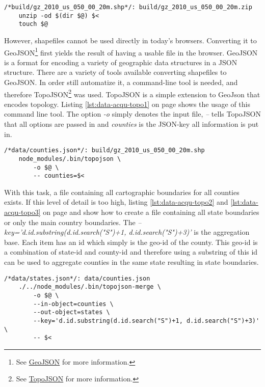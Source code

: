 \begin{lstlisting}[style={makefile}, caption={Make task for unzipping files}, label={lst:data-acqu-unzip}]
/*build/gz_2010_us_050_00_20m.shp*/: build/gz_2010_us_050_00_20m.zip
    unzip -od $(dir $@) $<
    touch $@
\end{lstlisting}

However, shapefiles cannot be used directly in today's browsers. Converting it to GeoJSON\footnote{See \href{http://geojson.org/}{GeoJSON} for more information.} first yields the result of having a usable file in the browser. GeoJSON is a format for encoding a variety of geographic data structures in a JSON structure. There are a variety of tools available converting shapefiles to GeoJSON. In order still automatize it, a command-line tool is needed, and therefore TopoJSON\footnote{See \href{https://github.com/mbostock/topojson}{TopoJSON} for more information.} was used. TopoJSON is a simple extension to GeoJson that encodes topology. Listing \ref{lst:data-acqu-topo1} on page \pageref{lst:data-acqu-topo1} shows the usage of this command line tool. The option \textit{-o} simply denotes the input file, \textit{--} tells TopoJSON that all options are passed in and \textit{counties} is the JSON-key all information is put in.

\begin{lstlisting}[style={makefile}, caption={Make task for converting shapefiles to geojson}, label={lst:data-acqu-topo1}]
/*data/counties.json*/: build/gz_2010_us_050_00_20m.shp
    node_modules/.bin/topojson \
        -o $@ \
        -- counties=$<
\end{lstlisting}

With this task, a file containing all cartographic boundaries for all counties exists. If this level of detail is too high, listing \ref{lst:data-acqu-topo2} and \ref{lst:data-acqu-topo3} on page \pageref{lst:data-acqu-topo2} and \pageref{lst:data-acqu-topo3} show how to create a file containing all state boundaries or only the main country boundaries. The \textit{--key='d.id.substring(d.id.search("S")+1, d.id.search("S")+3)'} is the aggregation base. Each item has an id which simply is the geo-id of the county. This geo-id is a combination of state-id and county-id and therefore using a substring of this id can be used to aggregate counties in the same state resulting in state boundaries.

\begin{lstlisting}[style={makefile}, caption={Make task for aggregating counties to states by state-id}, label={lst:data-acqu-topo2}]
/*data/states.json*/: data/counties.json
    ./../node_modules/.bin/topojson-merge \
        -o $@ \
        --in-object=counties \
        --out-object=states \
        --key='d.id.substring(d.id.search("S")+1, d.id.search("S")+3)' \
        -- $<
\end{lstlisting}

